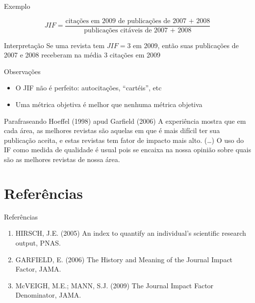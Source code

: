\documentclass{beamer}
\begin{document}
\begin{frame}{Exemplo}
  \begin{example}
    \begin{displaymath}
      JIF = \frac{\text{citações em 2009 de publicações de 2007 + 2008}}{\text{publicações citáveis de 2007 + 2008}}
    \end{displaymath}
  \end{example}
  \begin{block}{Interpretação}
    Se uma revista tem $JIF=3$ em 2009, então suas publicações de 2007 e 2008 receberam na média 3 citações em 2009
  \end{block}
\end{frame}

\begin{frame}{Observações}
  \begin{itemize}
  \item O JIF não é perfeito: autocitações, ``cartéis'', etc
  \item Uma métrica objetiva é melhor que nenhuma métrica objetiva

  \end{itemize}
  \begin{block}{Parafraseando Hoeffel (1998) apud Garfield (2006)}
A experiência mostra que em cada área, as melhores revistas são aquelas em que é mais difícil ter sua publicação aceita, e estas revistas tem fator de impacto mais alto. (\ldots) O uso do IF como medida de qualidade é usual pois se encaixa na nossa opinião sobre quais são as melhores revistas de nossa área.
  \end{block}
\end{frame}

\section{Referências}

\begin{frame}{Referências}
  \begin{enumerate}
  \item<1-> HIRSCH, J.E. (2005) An index to quantify an individual's scientific research output, PNAS.
  \item<1-> GARFIELD, E. (2006) The History and Meaning of the Journal Impact Factor, JAMA.
  \item<1-> McVEIGH, M.E.; MANN, S.J. (2009) The Journal Impact Factor Denominator, JAMA.
  \end{enumerate}
\end{frame}
\end{document}
